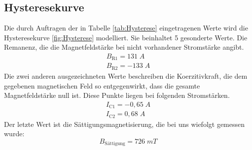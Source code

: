 \documentclass[titlepage = firstcover]{scrartcl}
\begin{document}
        \subsection{Hysteresekurve}
            Die durch Auftragen der in Tabelle \ref{tab:Hysterese} eingetragenen Werte wird die Hysteresekurve \ref{fig:Hysterese} modelliert. Sie beinhaltet 
            5 gesonderte Werte. Die Remanenz, die die Magnetfeldstärke bei nicht vorhandener Stromstärke angibt.
            \begin{align}
                B_{\text{R1}} = 131 \; A \\
                B_{\text{R2}} = -133 \; A 
                \label{eqn:Remanenzen}
            \end{align}
            Die zwei anderen ausgezeichneten Werte beschreiben die Koerzitivkraft, die dem gegebenen magnetischen Feld so entgegenwirkt, dass die gesamte
            Magnetfeldstärke null ist. Diese Punkte liegen bei folgenden Stromstärken.
            \begin{align}
                I_{\text{C1}} = -0,65 \; A\\
                I_{\text{C2}} = 0,68 \; A
                \label{eqn:Koerzitiv}
            \end{align} 
            Der letzte Wert ist die Sättigungsmagnetisierung, die bei uns wiefolgt gemessen wurde:
            \begin{equation*}
                B_{\text{Sättigung}} = 726 \; mT
            \end{equation*}
\end{document}
